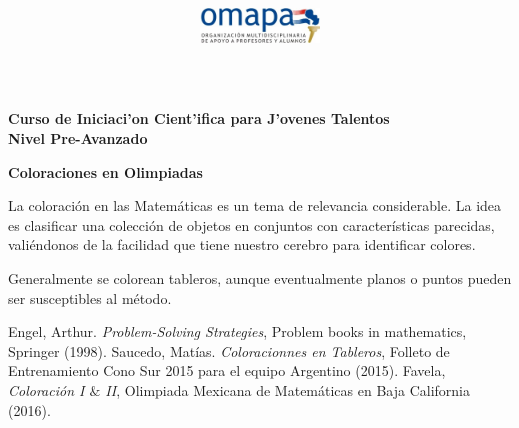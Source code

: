 \documentclass{article}
\title{
\begin{center}
\includegraphics[width=120px, height=40px]{omapa.jpg}\\
\end{center}
}
\date{}
\begin{document}
\maketitle
\begin{center}
\bfseries{Curso de Iniciaci'on Cient'ifica para J'ovenes Talentos\\
Nivel Pre-Avanzado \\
}
\end{center}

\begin{center}
	{\bfseries {\Large Coloraciones en Olimpiadas}}
\end{center}

La coloraci\'on en las Matem\'aticas es un tema de relevancia considerable. La idea es clasificar una colecci\'on de objetos en conjuntos con caracter\'isticas parecidas, vali\'endonos de la facilidad que tiene nuestro cerebro para identificar colores. 

Generalmente se colorean tableros, aunque eventualmente planos o puntos pueden ser susceptibles al m\'etodo.





%
%
%

\begin{thebibliography}{99}


 Engel, Arthur. \emph{Problem-Solving Strategies}, Problem books in mathematics, Springer (1998).
 Saucedo, Mat\'ias. \emph{Coloracionnes en Tableros}, Folleto de Entrenamiento Cono Sur 2015 para el equipo Argentino (2015).
 Favela, \emph{Coloraci\'on I $\&$ II}, Olimpiada Mexicana de Matem\'aticas en Baja California (2016).


\end{thebibliography}
\end{document}
